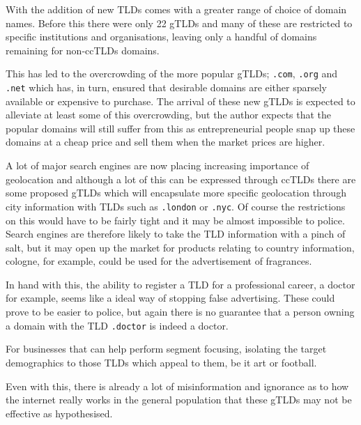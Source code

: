 \documentclass[11pt, a4paper]{article}
\begin{document}
With the addition of new \glspl{TLD} comes with a greater range of choice of
domain names. Before this there were only 22 \glspl{gTLD} and many of these are
restricted to specific institutions and organisations, leaving only a handful 
of domains remaining for non-\glspl{ccTLD} domains.

This has led to the overcrowding of the more popular \glspl{gTLD}; \texttt{.com},
\texttt{.org} and \texttt{.net} which has, in turn, ensured that desirable 
domains are either sparsely available or expensive to purchase. The arrival of
these new \glspl{gTLD} is expected to alleviate at least some of this 
overcrowding, but the author expects that the popular domains will still suffer
from this as entrepreneurial people snap up these domains at a cheap price and
sell them when the market prices are higher.

A lot of major search engines are now placing increasing importance of 
geolocation\cite{linkdex2012georanking} and although a lot of this can be
expressed through \glspl{ccTLD} there are some proposed \glspl{gTLD} which
will encapsulate more specific geolocation through city information with 
\glspl{TLD} such as \texttt{.london} or \texttt{.nyc}. Of course the 
restrictions on this would have to be fairly tight and it may be almost 
impossible to police. Search engines are therefore likely to take the
\gls{TLD} information with a pinch of salt, but it may open up the market for
products relating to country information, cologne, for example, could be used
for the advertisement of fragrances.

In hand with this, the ability to register a \gls{TLD} for a professional
career, a doctor for example, seems like a ideal way of stopping false 
advertising. These could prove to be easier to police, but again there is no
guarantee that a person owning a domain with the \gls{TLD} \texttt{.doctor} is
indeed a doctor.

For businesses that can help perform segment focusing, isolating the target
demographics to those \glspl{TLD} which appeal to them, be it art or football.

Even with this, there is already a lot of misinformation and ignorance as to
how the internet really works in the general population that these \glspl{gTLD}
may not be effective as hypothesised.
\end{document}
